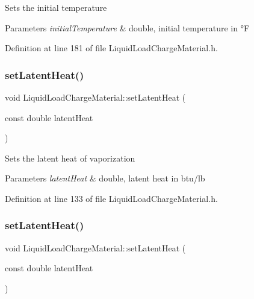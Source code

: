 Sets the initial temperature 
\begin{DoxyParams}{Parameters}
{\em initial\+Temperature} & double, initial temperature in °F \\
\hline
\end{DoxyParams}


Definition at line 181 of file Liquid\+Load\+Charge\+Material.\+h.

\mbox{\label{class_liquid_load_charge_material_a01d2d23580f27aa9e5cba1124635a677}} 
\subsubsection{\texorpdfstring{set\+Latent\+Heat()}{setLatentHeat()}\hspace{0.1cm}{\footnotesize\ttfamily [1/3]}}
{\footnotesize\ttfamily void Liquid\+Load\+Charge\+Material\+::set\+Latent\+Heat (\begin{DoxyParamCaption}\item[{const double}]{latent\+Heat }\end{DoxyParamCaption})\hspace{0.3cm}{\ttfamily [inline]}}

Sets the latent heat of vaporization 
\begin{DoxyParams}{Parameters}
{\em latent\+Heat} & double, latent heat in btu/lb \\
\hline
\end{DoxyParams}


Definition at line 133 of file Liquid\+Load\+Charge\+Material.\+h.

\mbox{\label{class_liquid_load_charge_material_a01d2d23580f27aa9e5cba1124635a677}} 
\subsubsection{\texorpdfstring{set\+Latent\+Heat()}{setLatentHeat()}\hspace{0.1cm}{\footnotesize\ttfamily [2/3]}}
{\footnotesize\ttfamily void Liquid\+Load\+Charge\+Material\+::set\+Latent\+Heat (\begin{DoxyParamCaption}\item[{const double}]{latent\+Heat }\end{DoxyParamCaption})\hspace{0.3cm}{\ttfamily [inline]}}

